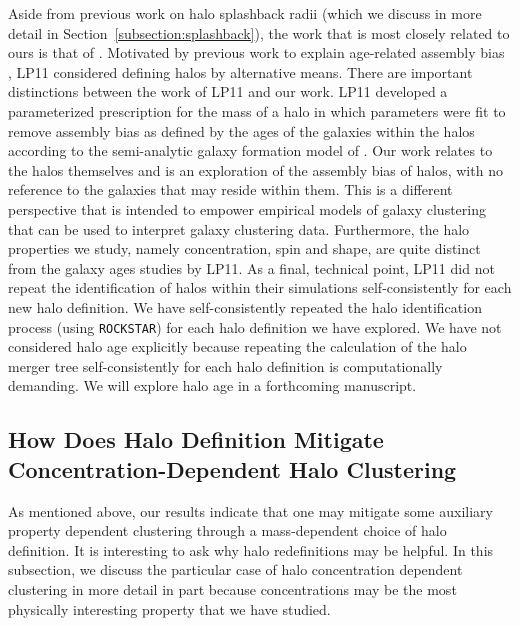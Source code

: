 \documentclass[usenatbib,fleqn]{mnras}
\begin{document}
Aside from previous work on halo splashback radii (which we discuss in more detail in Section~\ref{subsection:splashback}), the work that is most closely related to ours is that of \citet[][hereafter LP11]{lacerna_padilla11}. Motivated by previous work to explain age-related assembly bias \citep{wang_etal07,wang_etal08,warnick_etal08,dalal_etal08,hahn_etal09}, LP11 considered defining halos by alternative means. There are important distinctions between the work of LP11 and our work. LP11 developed a parameterized prescription for the mass of a halo in which parameters were fit to remove assembly bias as defined by the ages of the galaxies within the halos according to the semi-analytic galaxy formation model of \citet{lagos_etal08}. Our work relates to the halos themselves and is an exploration of the assembly bias of halos, with no reference to the galaxies that may reside within them. This is a different perspective that is intended to empower empirical models of galaxy clustering that can be used to interpret galaxy clustering data. Furthermore, the halo properties we study, namely concentration, spin and shape, are quite distinct from the galaxy ages studies by LP11. As a final, technical point, LP11 did not repeat the identification of halos within their simulations self-consistently for each new halo definition. We have self-consistently repeated the halo identification process (using {\tt ROCKSTAR}) for each halo definition we have explored. We have not considered halo age explicitly because repeating the calculation of the halo merger tree self-consistently for each halo definition is computationally demanding. We will explore halo age in a forthcoming manuscript.

\subsection{How Does Halo Definition Mitigate Concentration-Dependent Halo Clustering}
\label{section:halodefmit}

As mentioned above, our results indicate that one may mitigate some auxiliary property dependent clustering through a mass-dependent choice of halo definition. It is interesting to ask why halo redefinitions may be helpful. In this subsection, we discuss the particular case of halo concentration dependent clustering in more detail in part because concentrations may be the most physically interesting property that we have studied.
\end{document}
